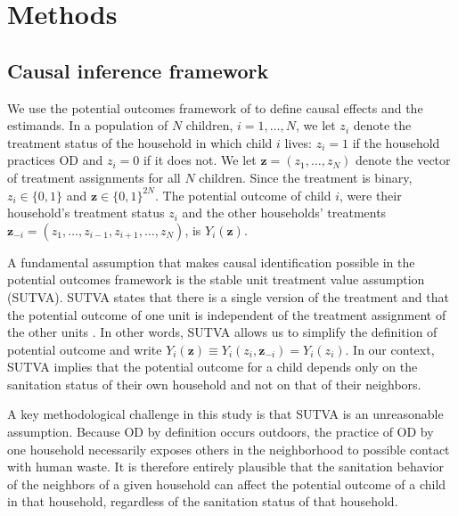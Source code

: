 \documentclass[12pt,a4paper,titlepage]{article}
\begin{document}


\section{Methods}
\subsection{Causal inference framework}
We use the potential outcomes framework of \cite{rubin1978} to define causal effects and the estimands. In a population of $N$ children, $i = 1, \ldots, N$, we let $z_i$ denote the treatment status of the household in which child $i$ lives: $z_i = 1$ if the household practices OD and $z_i = 0$ if it does not. We let $\mathbf{z} = (z_1, \ldots, z_N)$ denote the vector of treatment assignments for all $N$ children. Since the treatment is binary, $z_i \in \{0, 1\}$ and $\mathbf{z} \in \{0, 1\}^{2N}$. The potential outcome of child $i$, were their household's treatment status $z_i$ and the other households' treatments $\mathbf{z}_{-i} = (z_1, \ldots, z_{i-1}, z_{i+1}, \ldots, z_N)$, is $Y_i(\mathbf{z})$.

A fundamental assumption that makes causal identification possible in the potential outcomes framework is the stable unit treatment value assumption (SUTVA). SUTVA states that there is a single version of the treatment and that the potential outcome of one unit is independent of the treatment assignment of the other units \citep{rubin1986}. In other words, SUTVA allows us to simplify the definition of potential outcome and write $Y_i(\mathbf{z}) \equiv Y_i(z_i, \mathbf{z}_{-i}) = Y_i(z_i)$. In our context, SUTVA implies that the potential outcome for a child depends only on the sanitation status of their own household and not on that of their neighbors.

A key methodological challenge in this study is that SUTVA is an unreasonable assumption. Because OD by definition occurs outdoors, the practice of OD by one household necessarily exposes others in the neighborhood to possible contact with human waste. It is therefore entirely plausible that the sanitation behavior of the neighbors of a given household can affect the potential outcome of a child in that household, regardless of the sanitation status of that household.
\end{document}
